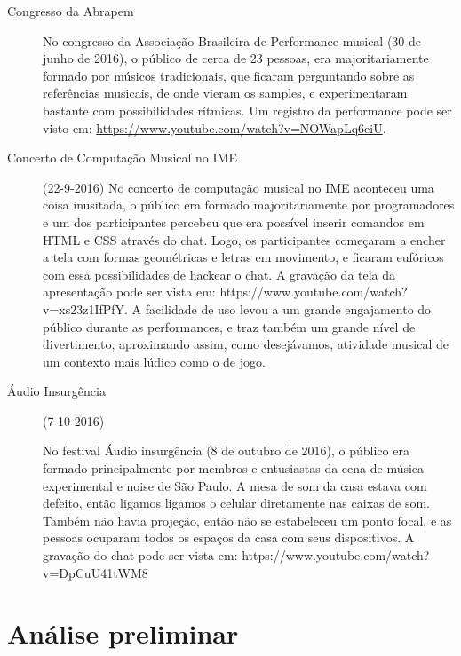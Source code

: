 \begin{description}
\item[Congresso da Abrapem]

No congresso da Associação Brasileira de Performance musical (30 de junho de 2016), o público de cerca de 23 pessoas, era majoritariamente formado por músicos tradicionais, que ficaram perguntando sobre as referências musicais, de onde vieram os samples, e experimentaram bastante com possibilidades rítmicas. Um registro da performance pode ser visto em:  \url{https://www.youtube.com/watch?v=NOWapLq6eiU}.



\item[Concerto de Computação Musical no IME] (22-9-2016)
No concerto de computação musical no IME aconteceu uma coisa inusitada, o público era formado majoritariamente por programadores e um dos participantes percebeu que era possível inserir comandos em HTML e CSS através do chat. Logo, os participantes começaram a encher a tela com formas geométricas e letras em movimento, e ficaram eufóricos com essa possibilidades de hackear o chat. A gravação da tela da apresentação pode ser vista em: https://www.youtube.com/watch?v=xs23z1IfPfY. A facilidade de uso levou a um grande engajamento do público durante as performances, e traz também um grande nível de divertimento, aproximando assim, como desejávamos, atividade musical de um contexto mais lúdico como o de jogo.

\item[Áudio Insurgência] (7-10-2016)

No festival Áudio insurgência (8 de outubro de 2016), o público era formado principalmente por membros e entusiastas da cena de música experimental e noise de São Paulo. A mesa de som da casa estava com defeito, então ligamos ligamos o celular diretamente nas caixas de som. Também não havia projeção, então não se estabeleceu um ponto focal, e as pessoas ocuparam todos os espaços da casa com seus dispositivos. A gravação do chat pode ser vista em: https://www.youtube.com/watch?v=DpCuU41tWM8 

\end{description}







\section{Análise preliminar}


